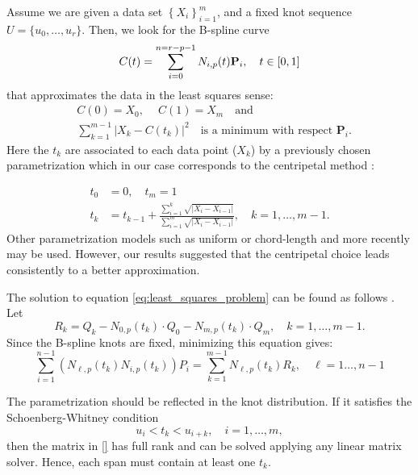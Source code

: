 Assume we are given a data set $\left\{X_i\right\}_{i=1}^m$, and a fixed knot sequence $U=\{u_0,\ldots,u_r\}$. 
Then, we 
look for the B-spline curve 
\begin{equation}
 C(t) = \sum_{i=0}^{n=r-p-1} N_{i,p}(t) \textbf P_i,\quad t\in[0,1]
\end{equation}
that approximates the data in the least squares sense:
\begin{align}\label{eq:least_squares_problem}
 & C(0)= X_0, \quad \  C(1) = X_m\quad \text{and}\\
 &\sum _{k= 1}^{m-1}\left | X_k - C(t_k)\right|^2\quad \text{is a minimum with respect }\mathbf P_i.
\end{align}
Here the $t_k$ are associated to each data point ($X_k$) by a previously chosen parametrization 
which in our case corresponds to the centripetal method \cite{lee1989}:

\begin{align}
 t_0 &= 0,\quad t_m = 1\\
 t_k &= t_{k-1} + \frac{\sum_{i=1}^{k}\sqrt{ |X_i - X_{i-1}|}}{\sum_{i = 1} ^ m \sqrt{|X_i- X_{i-1}|}}, \quad k = 1,\ldots,m-1.
\end{align}
Other parametrization models such as uniform \cite{} or chord-length \cite{} and more recently \cite{} may be used. However, 
our results suggested that the centripetal choice leads consistently to a better approximation. 


The solution to equation \eqref{eq:least_squares_problem} can be found as follows \cite[Ch. 9.4.1]{nurbs_book}. 
Let  
\begin{equation}
 R_k = Q_k - N_{0,p}(t_k)\cdot Q_0 - N_{m,p}(t_k)\cdot Q_m,  \quad k = 1,\ldots, m-1.
\end{equation}
Since the B-spline knots are fixed, minimizing this equation gives:
\begin{equation}\label{eq:linear_least_squares_solver}
 \sum_{i=1}^{n-1} \left(N_{\ell, p}(t_k)N_{i,p}(t_k)\right)P_i= \sum_{k=1}^{m-1}N_{\ell,p}(t_k)R_k, \quad \ell= 1\ldots, n-1
\end{equation}
 \begin{note}\label{note:sw_cond}
The parametrization should be reflected in the knot distribution. If it satisfies the 
Schoenberg-Whitney condition 
\begin {equation}
 u_i < t_k < u_{i+k},\quad i = 1,\ldots,m ,
\end {equation}
then the matrix in \eqref{} has full rank and can be solved applying any linear matrix solver. Hence, each
 span must contain at least one $t_k$. 
\end{note}

